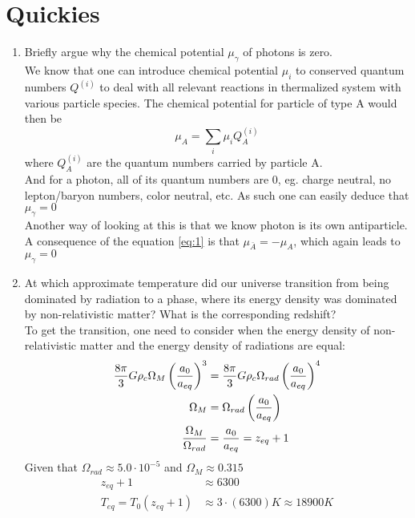 \section{Quickies}
\begin{enumerate}[label=(\alph*)]
\item Briefly argue why the chemical potential $\mu_{\gamma}$ of photons is zero.\\

We know that one can introduce chemical potential $\mu_i$ to conserved quantum numbers $Q^{(i)}$ to deal with all relevant reactions in thermalized system with various
particle species. The chemical potential for particle of type A would then be
\begin{equation} \label{eq:1}
\mu_A = \sum_i \mu_i Q^{(i)}_A
\end{equation}
where $Q^{(i)}_A$ are the quantum numbers carried by particle A.\\

And for a photon, all of its quantum numbers are 0, eg. charge neutral, no lepton/baryon numbers, color neutral, etc. As such one can easily deduce that $\mu_{\gamma} = 0$\\

Another way of looking at this is that we know photon is its own antiparticle. A consequence of the equation \ref{eq:1} is that $\mu_{\bar{A}} = -\mu_A $, which again leads to $\mu_{\gamma}=0$ %
\item At which approximate temperature did our universe transition from being dominated by radiation to a phase, where its energy density was dominated by non-relativistic matter? What is the corresponding redshift?\\
To get the transition, one need to consider when the energy density of non-relativistic matter and the energy density of radiations are equal:
\begin{align}
\frac{8\pi}{3}G\rho_c \Omega_M \left( \frac{a_0}{a_{eq}} \right)^3 &= \frac{8\pi}{3}G\rho_c \Omega_{rad} \left( \frac{a_0}{a_{eq}} \right)^4 \\
\Omega_M &= \Omega_{rad} \left( \frac{a_0}{a_{eq}} \right) \notag \\
\frac{\Omega_M }{\Omega_{rad}} &= \frac{a_0}{a_{eq}} = z_{eq} +1 
\end{align}
Given that $\Omega_{rad} \approx 5.0\cdot 10^{-5}$ and $\Omega_M \approx 0.315$ 
\begin{align}
z_{eq} +1 &\approx 6300\\ 
T_{eq} =T_0(z_{eq} +1 ) &\approx 3\cdot(6300) K \approx 18900K
\end{align}

\end{enumerate}
